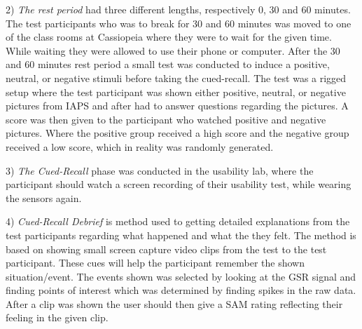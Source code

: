 2) \textit{The rest period} had three different lengths, respectively 0, 30 and 60 minutes. The test participants who was to break for 30 and 60 minutes was moved to one of the class rooms at Cassiopeia where they were to wait for the given time. While waiting they were allowed to use their phone or computer. After the 30 and 60 minutes rest period a small test was conducted to induce a positive, neutral, or negative stimuli before taking the cued-recall. The test was a rigged setup where the test participant was shown either positive, neutral, or negative  pictures from IAPS and after had to answer questions regarding the pictures. A score was then given to the participant who watched positive and negative pictures. Where the positive group received a high score and the negative group received a low score, which in reality was randomly generated.

3) \textit{The Cued-Recall} phase was conducted in the usability lab, where the participant should watch a screen recording of their usability test, while wearing the sensors again.

4) \textit{Cued-Recall Debrief} is method used to getting detailed explanations from the test participants regarding what happened and what the they felt.
The method is based on showing small screen capture video clips from the test to the test participant. These cues will help the participant remember the shown situation/event. The events shown was selected by looking at the GSR signal and finding points of interest which was determined by finding spikes in the raw data.
After a clip was shown the user should then give a SAM rating reflecting their feeling in the given clip.


